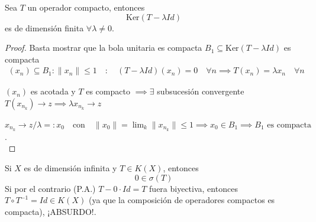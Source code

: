 \begin{teo}
    Sea $T$ un operador compacto, entonces 
    $$\text{Ker}(T - \lambda Id)$$
    es de dimensión finita $\forall \lambda \neq 0$.
\begin{proof} %
    Basta mostrar que la bola unitaria es compacta $B_1 \subseteq \text{Ker}(T - \lambda Id)$ es compacta
    \begin{align*}
        (x_n) \subseteq B_1 : \|x_n\| \leq 1 \quad : \quad (T - \lambda Id)(x_n) = 0 \quad \forall n \implies T(x_n) = \lambda x_n \quad \forall n
    \end{align*}


    \noindent $(x_n)$ es acotada y $T$ es compacto $\implies \exists$ subsucesión convergente $T(x_{n_k}) \to z \implies \lambda x_{n_k} \to z$

    \noindent $x_{n_k} \to z/\lambda =: x_0 \quad \text{con} \quad \|x_0\| = \lim_{k} \|x_{n_k}\| \leq 1 \implies x_0 \in B_1 \implies B_1 \text{ es compacta}$. \\
\end{proof}
\end{teo}


\begin{ejercicio}
    Si $X$ es de dimensión infinita y $T \in K(X)$, entonces 
    $$0 \in \sigma(T)$$
    Si por el contrario (P.A.) $T - 0 \cdot Id = T$ fuera biyectiva, entonces $T \circ T^{-1} = Id \in K(X)$ (ya que la composición de operadores compactos es compacta), ¡ABSURDO!.
\end{ejercicio}

